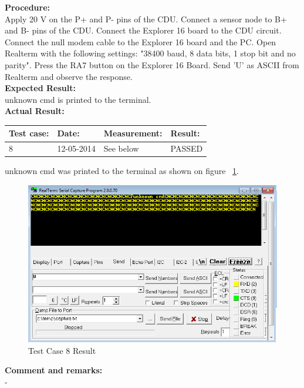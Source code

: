 \textbf{Procedure:}\\
Apply 20 V on the P+ and P- pins of the CDU. Connect a sensor node to B+ and B- pins of the CDU. Connect the Explorer 16 board to the CDU circuit. Connect the null modem cable to the Explorer 16 board and the PC. Open Realterm with the following settings: "38400 baud, 8 data bits, 1 stop bit and no parity". Press the RA7 button on the Explorer 16 Board. Send 'U' as ASCII from Realterm and observe the response.\\

\textbf{Expected Result:}\\
unknown cmd is printed to the terminal.\\

\textbf{Actual Result:}\\
\begin{table}[H]
\centering
\begin{tabular}{|p{2cm}|p{2cm}|p{3cm}|p{2cm}|}\hline
\textbf{Test case:} & \textbf{Date:} & \textbf{Measurement:} & \textbf{Result:} \\ \hline
8 & 12-05-2014 & See below & PASSED \\ \hline
\end{tabular}
\end{table}
unknown cmd was printed to the terminal as shown on figure ~\ref{fig:InteTestCase8}.
\begin{figure}[H]
\centering
\includegraphics[width=1\textwidth]{billeder/inte08}
\caption{Test Case 8 Result}
\label{fig:InteTestCase8}
\end{figure}

\textbf{Comment and remarks:}\\
-\\

